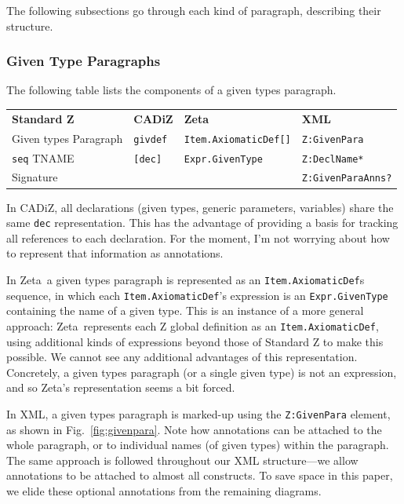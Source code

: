 \documentclass{llncs}  %
\newcommand{\AFont}[1]{\texttt{#1}}
\newcommand{\CADiZ}{CADiZ}
\newcommand{\Zeta}{Zeta}
\newcommand{\AParagraph}{Paragraph}
\newcommand{\TNAME}{TNAME}
\newcommand{\ASignature}{Signature}
\begin{document}
The following subsections go
through each kind of paragraph, describing their structure.


\subsubsection{Given Type Paragraphs}\label{giventypes}

The following table lists the components of a given types paragraph.

\begin{center}
\begin{tabular}{|l|l|l|l|}
\hline
{\bf Standard Z} & {\bf \CADiZ} & {\bf \Zeta} & {\bf XML}\\
Given types \AParagraph & \AFont{givdef} & \AFont{Item.AxiomaticDef[]} & \AFont{Z:GivenPara}\\
\hline
\AFont{seq} \TNAME & \AFont{[dec]} & \AFont{Expr.GivenType} & \AFont{Z:DeclName*}\\
\ASignature & & & \AFont{Z:GivenParaAnns?}\\
\hline
\end{tabular}
\end{center}

In \CADiZ, all declarations
(given types, generic parameters, variables)
share the same \AFont{dec} representation.
This has the advantage of providing a basis for
tracking all references to each declaration.
For the moment, I'm not worrying about
how to represent that information as annotations.

In \Zeta\ a given types paragraph is represented as
an \AFont{Item.AxiomaticDef}s sequence,
in which each \AFont{Item.AxiomaticDef}'s expression
is an \AFont{Expr.GivenType} containing the name of a given type.
This is an instance of a more general approach:
\Zeta\ represents each Z global definition as an \AFont{Item.AxiomaticDef},
using additional kinds of expressions beyond those of Standard Z
to make this possible.
We cannot see any additional advantages of this representation.
Concretely, a given types paragraph (or a single given type) is not an
expression, and so \Zeta's representation seems a bit forced. 

In XML, a given types paragraph is marked-up using
the \AFont{Z:GivenPara} element, as shown in Fig.~\ref{fig:givenpara}.
Note how annotations can be attached to the whole paragraph,
or to individual names (of given types) within the paragraph.
The same approach is followed throughout our XML structure---we allow
annotations to be attached to almost all constructs.  To save space in this
paper, we elide these optional annotations from the remaining diagrams.
\end{document}
